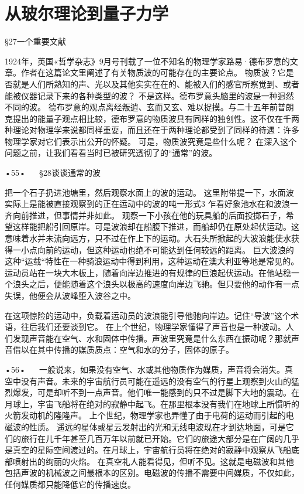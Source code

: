 \chapter{从玻尔理论到量子力学}

§27一个重要文献

1924年，英国«哲学杂志》9月号刊载了一位不知名的物理学家路易·德布罗意的文章。作者在这篇论文里阐述了有关物质波的可能存在的主要论点。
物质波？它是否就是人们所熟知的声、光以及其他实实在在的、能被入们的感官所察觉到、或者能被仪器记录下来的各种类型的波？
不是这样。德布罗意头脑里的波是一种迵然不同的波。
德布罗意的观点离经叛逍、玄而又玄、难以捉摸。与二十五年前普朗克提出的能量子观点相比较，德布罗意的物质波具有同样的独创性。这不仅在千两种理论对物理学来说都同样重耍，而且还在于两种理论都受到了同样的待遇：许多物理学家对它们表示出公开的怀疑。
可是，物质波究竟是些什么呢？
在深入这个问题之前，让我们看看当时已被研究透彻了的“通常”的波。

•55•
  
§28谈谈通常的波

把一个石子扔进池塘里，然后观察水面上的波的运动。
这里附带提一下，水面波实际上是能被直接观察到的正在运动中的波的吨一形式3
乍看好象池水在和波浪一齐向前推进，但事情并非如此。
观察一下小孩在他的玩具船的后面投掷石子，希望这样能把船引回原岸。可是波浪却在船腹下推进，而船却仍在原处起伏运动。这意味着水并未流向远方，只不过在作上下的运动。大石头所掀起的大波浪能使水获得一小点向前的运动，但这种运动也绝不可能达到任何较远的距离。
巨大波浪的这种“运载“特性在一种骑浪运动中得到利用，这种运动在澳大利亚等地是常见的。运动员站在一块大木板上，随着向岸边推进的有规律的巨浪起伏运动。在他站稳一个浪头之后，便能随着这个浪头以极高的速度向岸边飞驰。但只要他的动作有一点失误，他便会从波峰堕入波谷之中。

在这项惊险的运动中，负载着运动员的波浪能引导他驰向岸边。记住“导波”这个术语，往后我们还要谈到它。
在上个世纪，物理学家懂得了声音也是一种波动。人们发现声音能在空气、水和固体中传播。声波里究竟是什么东西在振动呢？那就声音借以在其中传播的媒质质点：空气和水的分子，固体的原子。

•56•
  
一般说来，如果没有空气、水或其他物质作为媒质，声音将会消失。真空中没有声音。未来的宇宙航行员可能在遥远的没有空气的行星上观察到火山的猛烈爆发，可是却听不到一点声音。他们唯一能感到的只不过是脚下大地的震动。在月球上，宇宙飞船将在绝对的寂静中起飞。在那里根本没有我们在地球上所惯听的火箭发动机的隆隆声。
上个世纪，物理学家也弄懂了由于电荷的运动而引起的电磁波的性质。
遥远的星体或星云发射出的光和无线电波现在才到达地面，可是它们的旅行在儿千年甚至几百万年以前就已开始。它们的旅途大部分是在广阔的几乎是真空的星际空间渡过的。在月球上，宇宙航行员将在绝对的寂静中观察从飞船底部喷射出的绚丽的火焰。
在真空礼人能看得见，但听不见。这就是电磁波和其他包括声波的机械波之间最根本的区别。电磁波的传播不需要中间媒质，不仅如此，任何媒质都只能降低它的传播速度。

